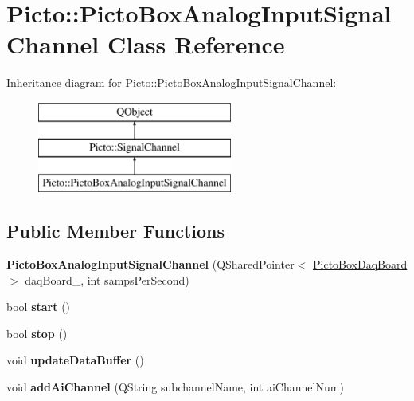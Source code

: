 \hypertarget{class_picto_1_1_picto_box_analog_input_signal_channel}{\section{Picto\-:\-:Picto\-Box\-Analog\-Input\-Signal\-Channel Class Reference}
\label{class_picto_1_1_picto_box_analog_input_signal_channel}
}
Inheritance diagram for Picto\-:\-:Picto\-Box\-Analog\-Input\-Signal\-Channel\-:\begin{figure}[H]
\begin{center}
\leavevmode
\includegraphics[height=3.000000cm]{class_picto_1_1_picto_box_analog_input_signal_channel}
\end{center}
\end{figure}
\subsection*{Public Member Functions}
\begin{DoxyCompactItemize}
\item 
\hypertarget{class_picto_1_1_picto_box_analog_input_signal_channel_a281b61e3f424a0057412d1d24de78b23}{{\bfseries Picto\-Box\-Analog\-Input\-Signal\-Channel} (Q\-Shared\-Pointer$<$ \hyperlink{class_picto_1_1_picto_box_daq_board}{Picto\-Box\-Daq\-Board} $>$ daq\-Board\-\_\-, int samps\-Per\-Second)}\label{class_picto_1_1_picto_box_analog_input_signal_channel_a281b61e3f424a0057412d1d24de78b23}

\item 
\hypertarget{class_picto_1_1_picto_box_analog_input_signal_channel_ae1ea4a1fe8582ada3dd45027b319c9f4}{bool {\bfseries start} ()}\label{class_picto_1_1_picto_box_analog_input_signal_channel_ae1ea4a1fe8582ada3dd45027b319c9f4}

\item 
\hypertarget{class_picto_1_1_picto_box_analog_input_signal_channel_a2b4d496893f9a5c3100ae3001a8c07d5}{bool {\bfseries stop} ()}\label{class_picto_1_1_picto_box_analog_input_signal_channel_a2b4d496893f9a5c3100ae3001a8c07d5}

\item 
\hypertarget{class_picto_1_1_picto_box_analog_input_signal_channel_abbe3d068444be7e61a81a132641aeef7}{void {\bfseries update\-Data\-Buffer} ()}\label{class_picto_1_1_picto_box_analog_input_signal_channel_abbe3d068444be7e61a81a132641aeef7}

\item 
\hypertarget{class_picto_1_1_picto_box_analog_input_signal_channel_a3e7573f9fd8c97a5d2401d609664b91f}{void {\bfseries add\-Ai\-Channel} (Q\-String subchannel\-Name, int ai\-Channel\-Num)}\label{class_picto_1_1_picto_box_analog_input_signal_channel_a3e7573f9fd8c97a5d2401d609664b91f}

\end{DoxyCompactItemize}
